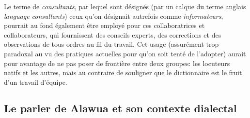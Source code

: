 Le terme de \emph{consultants}, par lequel sont désignés (par un calque du terme anglais \emph{language consultants}) ceux qu'on désignait autrefois comme \emph{informateurs}, pourrait au fond également être employé pour ces collaboratrices et collaborateurs, qui fournissent des conseils experts, des corrections et des observations de tous ordres au fil du travail. Cet usage (assurément trop paradoxal au vu des pratiques actuelles pour qu'on soit tenté de l'adopter) aurait pour avantage de ne pas poser de frontière entre deux groupes: les locuteurs natifs et les autres, mais au contraire de souligner que le dictionnaire est le fruit d'un travail d'équipe.



\subsection{Le parler de Alawua et son contexte dialectal}

